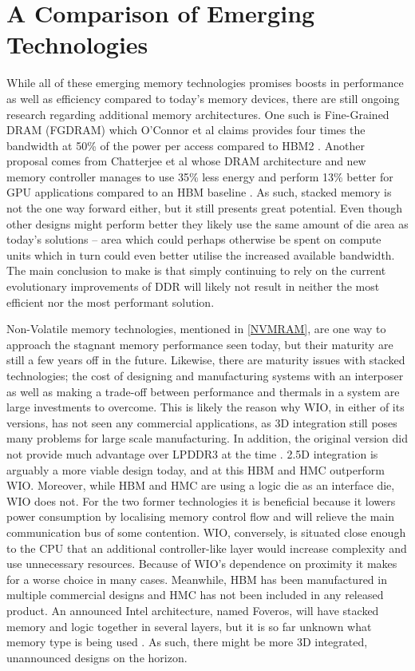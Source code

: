 \section{A Comparison of Emerging Technologies}
While all of these emerging memory technologies promises boosts in performance as well as efficiency compared to today's memory devices, there are still ongoing research regarding additional memory architectures. One such is Fine-Grained DRAM (FGDRAM) which O'Connor et al claims provides four times the bandwidth at 50\% of the power per access compared to HBM2 \cite{O'Connor:2017:FDE:3123939.3124545}. Another proposal comes from Chatterjee et al whose DRAM architecture and new memory controller manages to use 35\% less energy and perform 13\% better for GPU applications compared to an HBM baseline \cite{7920815}. As such, stacked memory is not the one way forward either, but it still presents great potential. Even though other designs might perform better they likely use the same amount of die area as today's solutions -- area which could perhaps otherwise be spent on compute units which in turn could even better utilise the increased available bandwidth. The main conclusion to make is that simply continuing to rely on the current evolutionary improvements of DDR will likely not result in neither the most efficient nor the most performant solution.
\bigskip

Non-Volatile memory technologies, mentioned in \ref{NVMRAM}, are one way to approach the stagnant memory performance seen today, but their maturity are still a few years off in the future. Likewise, there are maturity issues with stacked technologies; the cost of designing and manufacturing systems with an interposer as well as making a trade-off between performance and thermals in a system are large investments to overcome. This is likely the reason why WIO, in either of its versions, has not seen any commercial applications, as 3D integration still poses many problems for large scale manufacturing. In addition, the original version did not provide much advantage over LPDDR3 at the time \cite{7357085}. 2.5D integration is arguably a more viable design today, and at this HBM and HMC outperform WIO. Moreover, while HBM and HMC are using a logic die as an interface die, WIO does not. For the two former technologies it is beneficial because it lowers power consumption by localising memory control flow and will relieve the main communication bus of some contention. WIO, conversely, is situated close enough to the CPU that an additional controller-like layer would increase complexity and use unnecessary resources. Because of WIO's dependence on proximity it makes for a worse choice in many cases. Meanwhile, HBM has been manufactured in multiple commercial designs and HMC has not been included in any released product. An announced Intel architecture, named Foveros, will have stacked memory and logic together in several layers, but it is so far unknown what memory type is being used \cite{khushu_gomes_2019}. As such, there might be more 3D integrated, unannounced designs on the horizon.
\bigskip

